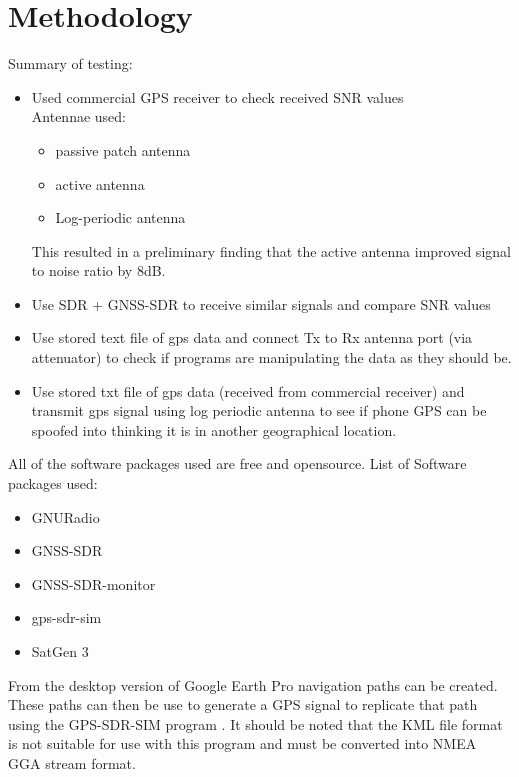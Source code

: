 
\chapter{Methodology} %

\label{Chapter4} %
Summary of testing:
\begin{itemize}
    \item Used commercial GPS receiver to check received SNR values \\ Antennae used:
    \begin{itemize}
        \item passive patch antenna
        \item active antenna
        \item Log-periodic antenna
    \end{itemize}
    This resulted in a preliminary finding that the active antenna improved signal to noise ratio by 8dB. 
    \item Use SDR + GNSS-SDR to receive similar signals and compare SNR values
    \item Use stored text file of gps data and connect Tx to Rx antenna port (via attenuator) to check if programs are manipulating the data as they should be.
    \item Use stored txt file of gps data (received from commercial receiver) and transmit gps signal using log periodic antenna to see if phone GPS can be spoofed into thinking it is in another geographical location.
\end{itemize}
\medskip
All of the software packages used are free and opensource.
List of Software packages used:
\begin{itemize}
    \item GNURadio
    \item GNSS-SDR
    \item GNSS-SDR-monitor
    \item gps-sdr-sim
    \item SatGen 3
\end{itemize}

From the desktop version of Google Earth Pro navigation paths can be created. These paths can then be use to generate a GPS signal to replicate that path using the
GPS-SDR-SIM program \cite{RN42}. It should be noted that the KML file format is not suitable for use with this program and must be converted into NMEA GGA stream format.

